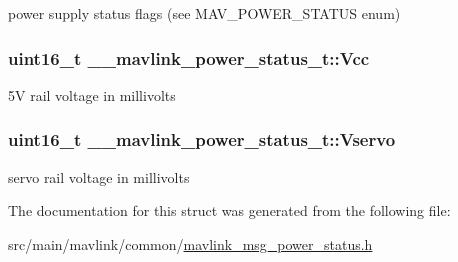 power supply status flags (see M\+A\+V\+\_\+\+P\+O\+W\+E\+R\+\_\+\+S\+T\+A\+T\+U\+S enum) 

\hypertarget{struct____mavlink__power__status__t_a98735761e8f17e7b2bc362a2aaea4b11}{
\subsubsection[{Vcc}]{\setlength{\rightskip}{0pt plus 5cm}uint16\+\_\+t \+\_\+\+\_\+mavlink\+\_\+power\+\_\+status\+\_\+t\+::\+Vcc}}\label{struct____mavlink__power__status__t_a98735761e8f17e7b2bc362a2aaea4b11}


5\+V rail voltage in millivolts 

\hypertarget{struct____mavlink__power__status__t_a436f6c452d819c074f8153019d210e08}{
\subsubsection[{Vservo}]{\setlength{\rightskip}{0pt plus 5cm}uint16\+\_\+t \+\_\+\+\_\+mavlink\+\_\+power\+\_\+status\+\_\+t\+::\+Vservo}}\label{struct____mavlink__power__status__t_a436f6c452d819c074f8153019d210e08}


servo rail voltage in millivolts 



The documentation for this struct was generated from the following file\+:\begin{DoxyCompactItemize}
\item 
src/main/mavlink/common/\hyperlink{mavlink__msg__power__status_8h}{mavlink\+\_\+msg\+\_\+power\+\_\+status.\+h}\end{DoxyCompactItemize}
